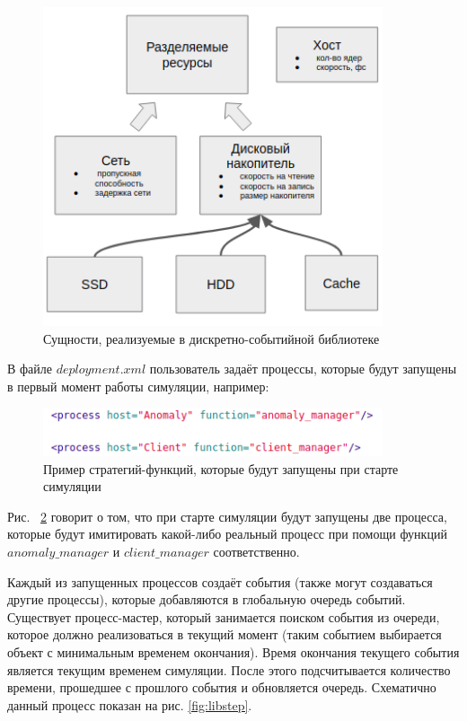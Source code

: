 \begin{figure}[!ht]
\centering
\includegraphics[width=10cm]{Kenenbek/images/libmodel.png}
\caption{Сущности, реализуемые в дискретно-событийной библиотеке}
\label{fig:libmodel}
\end{figure}

В файле $deployment.xml$ пользователь задаёт процессы, которые будут запущены в первый момент работы симуляции, например:

\begin{figure}[!ht]
\centering
\includegraphics[width=10cm]{Kenenbek/images/deployfunc.png}
\caption{Пример стратегий-функций, которые будут запущены при старте симуляции}
\label{fig:deployfunc}
\end{figure}

Рис. ~\ref{fig:deployfunc} говорит о том, что при старте симуляции будут запущены две процесса, которые будут имитировать какой-либо реальный процесс при помощи функций $anomaly\_manager$ и $client\_manager$ соответственно. 

Каждый из запущенных процессов создаёт события (также могут создаваться другие процессы), которые добавляются в глобальную очередь событий. Существует процесс-мастер, который занимается поиском события из очереди, которое должно реализоваться в текущий момент (таким событием выбирается объект с минимальным временем окончания). Время окончания текущего события является текущим временем симуляции. После этого подсчитывается количество времени, прошедшее с прошлого события и обновляется очередь. Схематично данный процесс показан на рис. \ref{fig:libstep}.
 
